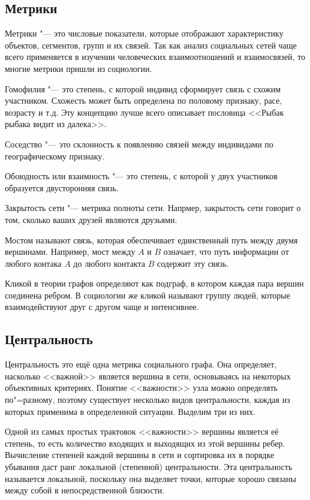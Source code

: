 \subsection{Метрики}
Метрики "--- это числовые показатели, которые отображают характеристику объектов, сегментов, групп и их связей. Так как анализ социальных сетей чаще всего применяется в изучении человеческих взаимоотношений и взаимосвязей, то многие метрики пришли из социологии.

Гомофилия "--- это степень, с которой индивид сформирует связь с схожим участником. Схожесть может быть определена по половому признаку, расе, возрасту и т.д. Эту концепцию лучше всего описывает пословица <<Рыбак рыбака видит из далека>>.

Соседство "--- это склонность к появлению связей между индивидами по географическому признаку.

Обоюдность или взаимность "--- это степень, с которой у двух участников образуется двусторонняя связь\cite{kadushin2012understanding}.

Закрытость сети "--- метрика полноты сети. Напрмер, закрытость сети говорит о том, сколько ваших друзей являются друзьями\cite{wong2014design}.

Мостом называют связь, которая обеспечивает единственный путь между двумя вершинами. Например, мост между $A$ и $B$ означает, что путь информации от любого контака $A$ до любого контакта $B$ содержит эту связь\cite{Granovetter}.

Кликой в теории графов определяют как подграф, в котором каждая пара вершин соединена ребром. В социологии же кликой называют группу людей, которые взаимодействуют друг с другом чаще и интенсивнее\cite{wong2014design}.

\subsection{Центральность}
Центральность это ещё одна метрика социального графа. Она определяет, насколько  <<важной>> является вершина в сети, основываясь на некоторых объективных критериях\cite{hansen2010analyzing}. Понятие <<важности>> узла можно определять по"=разному, поэтому существует несколько видов центральности, каждая из которых применима в определенной ситуации. Выделим три из них.

Одной из самых простых трактовок <<важности>> вершины является её степень, то есть количество входящих и выходящих из этой вершины ребер. Вычисление степеней каждой вершины в сети и сортировка их в порядке убывания даст ранг локальной (степенной) центральности. Эта центральность называется локальной, поскольку она выделяет точки, которые хорошо связаны между собой в непосредственной близости\cite{scott2012social}.

